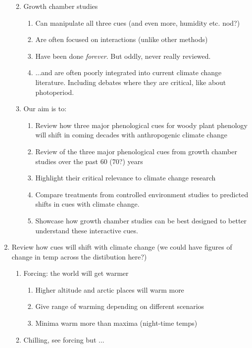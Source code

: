 \documentclass[11pt,letterpaper]{article}
\begin{document}
\begin{enumerate}
\begin{enumerate}
\begin{enumerate}
\end{enumerate}
\item Growth chamber studies
\begin{enumerate}
\item Can manipulate all three cues (and even more, humidity etc. nod?)
\item Are often focused on interactions (unlike other methods)
\item Have been done \emph{forever}. But oddly, never really reviewed.
\item  ...and are often poorly integrated into current climate change literature. Including debates where they are critical, like about photoperiod.
\end{enumerate}
\item Our aim is to:
\begin{enumerate}
\item Review how three major phenological cues for woody plant phenology will shift in coming decades with anthropogenic climate change
\item Review of the three major phenological cues from growth chamber studies over the past 60 (70?) years
\item Highlight their critical relevance to climate change research
\item Compare treatments from controlled environment studies to predicted shifts in cues with climate change.  
\item Showcase how growth chamber studies can be best designed to better understand these interactive cues. 
\end{enumerate}
\end{enumerate}
\item Review how cues will shift with climate change (we could have figures of change in temp across the distibution here?)
\begin{enumerate}
\item Forcing: the world will get warmer %
\begin{enumerate}
\item Higher altitude and arctic places will warm more
\item Give range of warming depending on different scenarios
\item Minima warm more than maxima (night-time temps)
\end{enumerate}
\item Chilling, see forcing but ... 
\begin{enumerate}

\end{enumerate}
\end{enumerate}
\end{enumerate}
\end{document}
